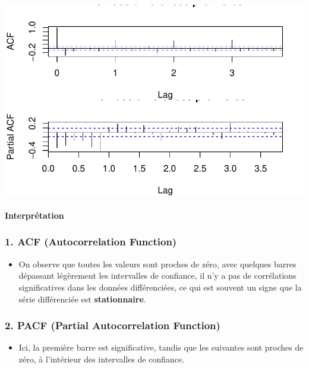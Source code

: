 \documentclass[
  letterpaper,
  DIV=11,
  numbers=noendperiod]{scrartcl}
\let\oldparagraph\paragraph
\renewcommand{\paragraph}[1]{\oldparagraph{#1}\mbox{}}
\providecommand{\tightlist}{%
  \setlength{\itemsep}{0pt}\setlength{\parskip}{0pt}}\usepackage{longtable,booktabs,array}
\begin{document}
\includegraphics{TS_files/figure-pdf/unnamed-chunk-5-1.pdf}

\paragraph{Interprétation}\label{interpruxe9tation-3}

\subsubsection{1. ACF (Autocorrelation
Function)}\label{acf-autocorrelation-function}

\begin{itemize}
\tightlist
\item
  On observe que toutes les valeurs sont proches de zéro, avec quelques
  barres dépassant légèrement les intervalles de confiance, il n'y a pas
  de corrélations significatives dans les données différenciées, ce qui
  est souvent un signe que la série différenciée est
  \textbf{stationnaire}.
\end{itemize}

\subsubsection{2. PACF (Partial Autocorrelation
Function)}\label{pacf-partial-autocorrelation-function}

\begin{itemize}
\tightlist
\item
  Ici, la première barre est significative, tandis que les suivantes
  sont proches de zéro, à l'intérieur des intervalles de confiance.\\
  \strut \\
\end{itemize}
\end{document}
